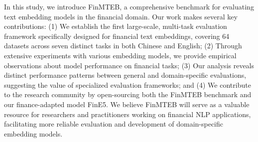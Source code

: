 
In this study, we introduce FinMTEB, a comprehensive benchmark for evaluating text embedding models in the financial domain. Our work makes several key contributions: (1) We establish the first large-scale, multi-task evaluation framework specifically designed for financial text embeddings, covering 64 datasets across seven distinct tasks in both Chinese and English; (2) Through extensive experiments with various embedding models, we provide empirical observations about model performance on financial tasks; (3) Our analysis reveals distinct performance patterns between general and domain-specific evaluations, suggesting the value of specialized evaluation frameworks; and (4) We contribute to the research community by open-sourcing both the FinMTEB benchmark and our finance-adapted model FinE5. We believe FinMTEB will serve as a valuable resource for researchers and practitioners working on financial NLP applications, facilitating more reliable evaluation and development of domain-specific embedding models.